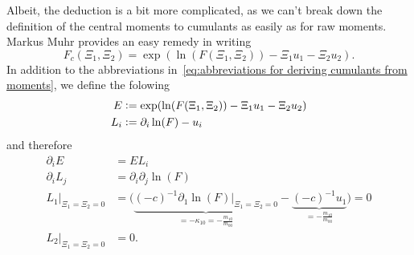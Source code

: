 \documentclass{article}
\begin{document}
Albeit, the deduction is a bit more complicated, as we can't break down the definition of the central moments to cumulants as easily as for raw moments.
Markus Muhr provides an easy remedy in writing
\begin{equation}
  F_c(\Xi_1, \Xi_2) = \exp(\ln(F(\Xi_1,\Xi_2)) - \Xi_1 u_1 - \Xi_2 u_2).
\end{equation}
In addition to the abbreviations in~\eqref{eq:abbreviations for deriving cumulants from moments}, we define the folowing
\begin{equation}
  \begin{aligned}
    E & \mathrel{\mathop:}= \exp(\ln(F(\Xi_1,\Xi_2)) - \Xi_1 u_1 - \Xi_2 u_2) \\
    L_i & \mathrel{\mathop:}= \partial_i \ln(F) - u_i
  \end{aligned}
\end{equation}
and therefore
\begin{equation}
  \begin{aligned}
    \partial_i E & = EL_i \\
    \partial_i L_j & = \partial_i\partial_j\ln(F)\\
    L_1\bigr|_{\Xi_1=\Xi_2 = 0} & = \bigg(
      \underbrace{{(-c)}^{-1} \partial_1\ln(F) \bigr|_{\Xi_1=\Xi_2 = 0}}_{=-\kappa_{10}=-\frac{m_{10}}{m_{00}}}
      - \underbrace{{(-c)}^{-1}u_1}_{=-\frac{m_{10}}{m_{00}}} \bigg) = 0 \\
    L_2\bigr|_{\Xi_1=\Xi_2 = 0} & = 0.
  \end{aligned}
\end{equation}
\end{document}
